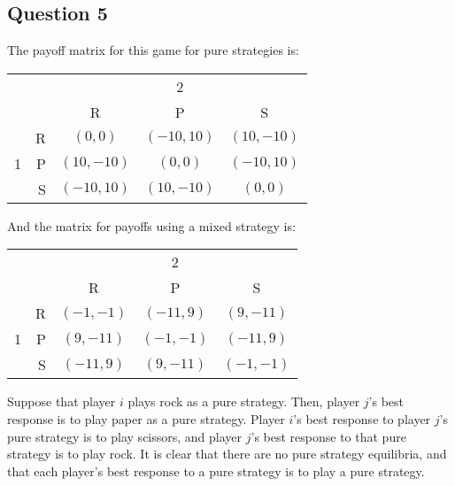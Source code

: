\documentclass{article}
\begin{document}
\subsection*{Question 5}
The payoff matrix for this game for pure strategies is:
	\begin{center}
		\begin{tabular}{crccc}
		&					& \multicolumn{3}{c}{2}													\\
		&					& R						& P						& S				\\ \cline{3-5} 
		\multirow{3}{*}{1}						
		& R			& \multicolumn{1}{|c|}{$(0,0)$}	& \multicolumn{1}{|c|}{$(-10,10)$}	& \multicolumn{1}{|c|}{$(10,-10)$}	\\ \cline{3-5}
		& P			& \multicolumn{1}{|c|}{$(10,-10)$}	& \multicolumn{1}{|c|}{$(0,0)$}	& \multicolumn{1}{|c|}{$(-10,10)$}	\\ \cline{3-5}
		& S			& \multicolumn{1}{|c|}{$(-10,10)$}	& \multicolumn{1}{|c|}{$(10,-10)$}	& \multicolumn{1}{|c|}{$(0,0)$}	\\ \cline{3-5}
		\end{tabular}
	\end{center}
And the matrix for payoffs using a mixed strategy is:
	\begin{center}
		\begin{tabular}{crccc}
		&					& \multicolumn{3}{c}{2}													\\
		&					& R						& P						& S				\\ \cline{3-5} 
		\multirow{3}{*}{1}						
		& R			& \multicolumn{1}{|c|}{$(-1,-1)$}	& \multicolumn{1}{|c|}{$(-11,9)$}	& \multicolumn{1}{|c|}{$(9,-11)$}	\\ \cline{3-5}
		& P			& \multicolumn{1}{|c|}{$(9,-11)$}	& \multicolumn{1}{|c|}{$(-1,-1)$}	& \multicolumn{1}{|c|}{$(-11,9)$}	\\ \cline{3-5}
		& S			& \multicolumn{1}{|c|}{$(-11,9)$}	& \multicolumn{1}{|c|}{$(9,-11)$}	& \multicolumn{1}{|c|}{$(-1,-1)$}	\\ \cline{3-5}
		\end{tabular}
	\end{center}
Suppose that player $i$ plays rock as a pure strategy. Then, player $j$'s best response is to play paper as a pure strategy. Player $i$'s best response to player $j$'s pure strategy is to play scissors, and player $j$'s best response to that pure strategy is to play rock. It is clear that there are no pure strategy equilibria, and that each player's best response to a pure strategy is to play a pure strategy.
\end{document}
